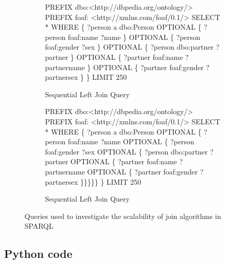 \documentclass[10pt,a4paper]{article}
\begin{document}
	\begin{figure}[h]
		\begin{subfigure}[b]{0.5\textwidth}
			\begin{algorithmic}
				\STATE PREFIX dbo:\textless http://dbpedia.org/ontology/\textgreater
				\STATE PREFIX foaf: \textless http://xmlns.com/foaf/0.1/\textgreater
				\STATE SELECT *
				\STATE WHERE \{
					\STATE 	?person a dbo:Person
					\STATE 	OPTIONAL \{ ?person foaf:name ?name \}
					\STATE 	OPTIONAL \{ ?person foaf:gender ?sex \}
					\STATE 	OPTIONAL \{ ?person dbo:partner ?partner \}
					\STATE 	OPTIONAL \{ ?partner foaf:name ?partnername \}
					\STATE 	OPTIONAL \{ ?partner foaf:gender ?partnersex \}
					\STATE \}
				\STATE LIMIT 250
			\end{algorithmic}
			\caption{Sequential Left Join Query}
			\label{alg:seq_left_join}
		\end{subfigure}
		\begin{subfigure}[b]{0.5\textwidth}
			\begin{algorithmic}
				\STATE PREFIX dbo:\textless http://dbpedia.org/ontology/\textgreater
				\STATE PREFIX foaf: \textless http://xmlns.com/foaf/0.1/\textgreater
				\STATE SELECT *
				\STATE WHERE \{
					\STATE 	?person a dbo:Person
					\STATE 	OPTIONAL \{ ?person foaf:name ?name
					\STATE 	OPTIONAL \{ ?person foaf:gender ?sex
					\STATE 	OPTIONAL \{ ?person dbo:partner ?partner
					\STATE 	OPTIONAL \{ ?partner foaf:name ?partnername
					\STATE 	OPTIONAL \{ ?partner foaf:gender ?partnersex
					\STATE  \}\}\}\}\}
					\STATE \}
				\STATE LIMIT 250
			\end{algorithmic}
			\caption{Sequential Left Join Query}
			\label{alg:nested_left_join}
		\end{subfigure}
		
		\caption{Queries used to investigate the scalability of join algorithms in SPARQL}
		\label{queries}
	\end{figure}
	
	\subsection*{Python code}
	
\end{document}
